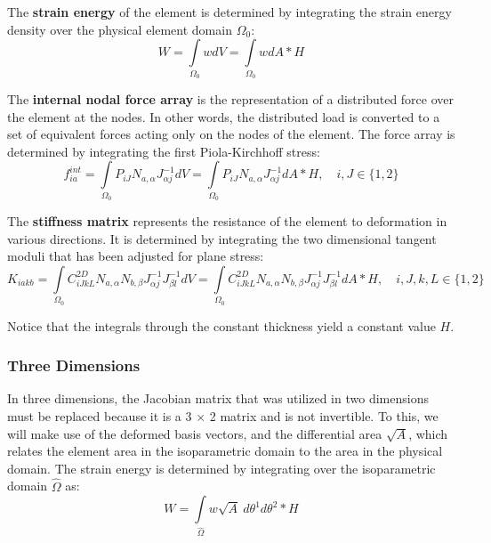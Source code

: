 \documentclass[]{spie}  %
\begin{document}
The \textbf{strain energy} of the element is determined by integrating the strain energy density over the physical element domain $\Omega_0$:
\begin{equation}
\label{eq: strain energy}
W = \int\limits_{\Omega_0} w dV = \int\limits_{\Omega_0} w dA * H
\end{equation}

The \textbf{internal nodal force array} is the representation of a distributed force over the element at the nodes. In other words, the distributed load is converted to a set of equivalent forces acting only on the nodes of the element. The force array is determined by integrating the first Piola-Kirchhoff stress:
\begin{equation}
\label{eq: internal nodal force array}
f_{ia}^{int} = \int\limits_{\Omega_0} P_{iJ} N_{a,\alpha} J_{\alpha j}^{-1} dV = \int\limits_{\Omega_0} P_{iJ} N_{a,\alpha} J_{\alpha j}^{-1} dA * H, \quad i, J \in \{1, 2\}
\end{equation}

The \textbf{stiffness matrix} represents the resistance of the element to deformation in various directions. It is determined by integrating the two dimensional tangent moduli that has been adjusted for plane stress:
\begin{equation}
\label{eq: stiffness matrix}
K_{iakb} = \int\limits_{\Omega_0} C_{iJkL}^{2D} N_{a,\alpha} N_{b,\beta} J_{\alpha j}^{-1} J_{\beta l}^{-1} dV = \int\limits_{\Omega_0} C_{iJkL}^{2D} N_{a,\alpha} N_{b,\beta} J_{\alpha j}^{-1} J_{\beta l}^{-1} dA * H, \quad i, J, k, L \in \{1, 2\}
\end{equation}

Notice that the integrals through the constant thickness yield a constant value $H$. 

\subsubsection{Three Dimensions}
In three dimensions, the Jacobian matrix that was utilized in two dimensions must be replaced because it is a 3 $\times$ 2 matrix and is not invertible. To this, we will make use of the deformed basis vectors, and the differential area $\sqrt{A}$, which relates the element area in the isoparametric domain to the area in the physical domain. The strain energy is determined by integrating over the isoparametric domain $\hat{\Omega}$ as:
\begin{equation}
\label{eq: strain energy full}
W = \int\limits_{\hat{\Omega}} w \sqrt{A} \ d\theta^1 d\theta^2 * H 
\end{equation}
\end{document}
